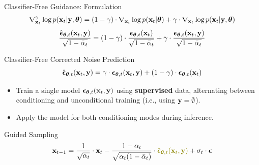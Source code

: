 \documentclass{beamer}
\begin{document}
\begin{frame}{Classifier-Free Guidance: Formulation}
	\[
		\nabla_{\mathbf{x}_t}^{\gamma} \log p(\mathbf{x}_t | \mathbf{y}, \boldsymbol{\theta}) =  (1 - \gamma) \cdot  \nabla_{\mathbf{x}_t} \log p(\mathbf{x}_t | \boldsymbol{\theta}) + \gamma \cdot  \nabla_{\mathbf{x}_t} \log p(\mathbf{x}_t| \mathbf{y}, \boldsymbol{\theta})
	\]
	\[
		\frac{\hat{\boldsymbol{\epsilon}}_{\boldsymbol{\theta}, t}(\mathbf{x}_t, \mathbf{y})}{\sqrt{1 - \bar{\alpha}_t}} = (1 - \gamma) \cdot  \frac{\boldsymbol{\epsilon}_{\boldsymbol{\theta}, t}(\mathbf{x}_t)}{\sqrt{1 - \bar{\alpha}_t}} +  \gamma \cdot \frac{\boldsymbol{\epsilon}_{\boldsymbol{\theta}, t}(\mathbf{x}_t, \mathbf{y})}{\sqrt{1 - \bar{\alpha}_t}} 
	\]
	\begin{block}{Classifier-Free Corrected Noise Prediction}
		\vspace{-0.3cm}
		\[
			\hat{\boldsymbol{\epsilon}}_{\boldsymbol{\theta}, t}(\mathbf{x}_t, \mathbf{y}) = \gamma \cdot \boldsymbol{\epsilon}_{\boldsymbol{\theta}, t}(\mathbf{x}_t, \mathbf{y}) + (1 - \gamma) \cdot \boldsymbol{\epsilon}_{\boldsymbol{\theta}, t}(\mathbf{x}_t)
		\]
		\vspace{-0.5cm}
	\end{block}
	\begin{itemize}
		\item Train a single model $\boldsymbol{\epsilon}_{\boldsymbol{\theta}, t}(\mathbf{x}_t, \mathbf{y})$ using \textbf{supervised} data, alternating between conditioning and unconditional training (i.e., using $\mathbf{y} = \emptyset$).
		\item Apply the model for both conditioning modes during inference.
	\end{itemize}
	\begin{block}{Guided Sampling}
		\vspace{-0.3cm}
		\[
			\bx_{t-1} = \frac{1}{\sqrt{\alpha_t}} \cdot \bx_t - \frac{1 - \alpha_t}{\sqrt{\alpha_t (1 - \bar{\alpha}_t)}} \cdot  {\color{olive}\hat{\bepsilon}_{\btheta, t}(\bx_t, \by)} + \sigma_t \cdot \bepsilon
		\]
	\end{block}
\end{frame}
\end{document}
